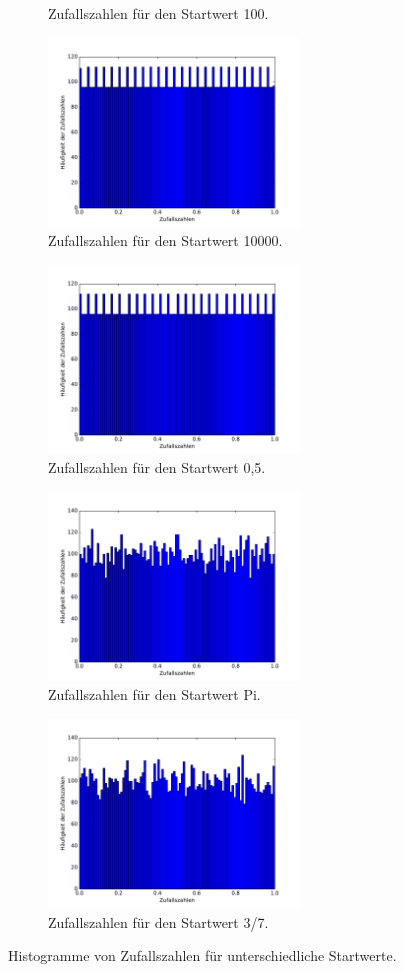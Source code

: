 \documentclass[
  bibliography=totoc,     %
  captions=tableheading,  %
  titlepage=firstiscover, %
]{scrartcl}
\begin{document}
\begin{figure}[H]
\begin{subfigure}{0.48\textwidth}
    \caption{Zufallszahlen für den Startwert 100.}
  \end{subfigure}
  \begin{subfigure}{0.48\textwidth}
    \centering
    \includegraphics[height=5cm]{Histogrammb6.pdf}
    \caption{Zufallszahlen für den Startwert 10000.}
  \end{subfigure}
  \centering
  \begin{subfigure}{0.48\textwidth}
    \centering
    \includegraphics[height=5cm]{Histogrammb7.pdf}
    \caption{Zufallszahlen für den Startwert 0,5.}
  \end{subfigure}
  \begin{subfigure}{0.48\textwidth}
    \centering
    \includegraphics[height=5cm]{Histogrammb8.pdf}
    \caption{Zufallszahlen für den Startwert Pi.}
  \end{subfigure}
  \begin{subfigure}{0.48\textwidth}
    \centering
    \includegraphics[height=5cm]{Histogrammb9.pdf}
    \caption{Zufallszahlen für den Startwert 3/7.}
  \end{subfigure}
  \caption{Histogramme von Zufallszahlen für unterschiedliche Startwerte.}
  \label{fig:histogramme}
\end{figure}
\end{document}

